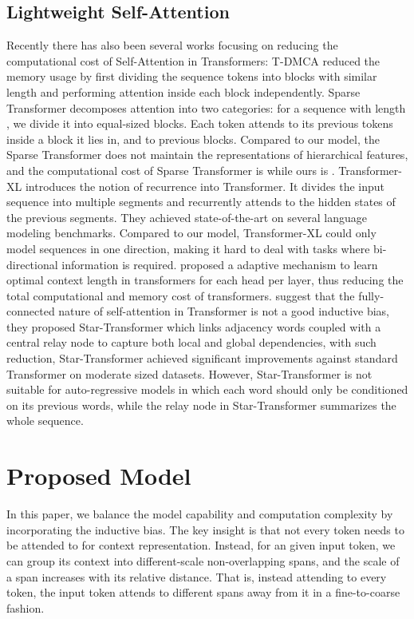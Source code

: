 \documentclass[11pt,a4paper]{article}
\begin{document}
\subsection{Lightweight Self-Attention }
Recently there has also been several works focusing on reducing the computational cost of Self-Attention in Transformers: T-DMCA \citep{LiuSPGSKS18} reduced the memory usage by first dividing the sequence tokens into blocks with similar length and performing attention inside each block independently. Sparse Transformer \citep{child2019sparsetransformer} decomposes attention into two categories: for a sequence with length , we divide it into  equal-sized blocks. Each token attends to its previous tokens inside a  block it lies in, and to  previous blocks. Compared to our model, the Sparse Transformer does not maintain the representations of hierarchical features, and the computational cost of Sparse Transformer is  while ours is .
 Transformer-XL \citep{dai2019transformer} introduces the notion of recurrence into Transformer. It divides the input sequence into multiple segments and recurrently attends to the hidden states of the previous segments. They achieved state-of-the-art on several language modeling benchmarks. Compared to our model, Transformer-XL could only model sequences in one direction, making it hard to deal with tasks where bi-directional information is required. \citet{sukhbaatar2019adaptive} proposed a adaptive mechanism to learn optimal context length in transformers for each head per layer, thus reducing the total computational and memory cost of transformers. \citet{guo2019startransformer} suggest that the fully-connected nature of self-attention in Transformer is not a good inductive bias, they proposed Star-Transformer which links adjacency words coupled with a central relay node to capture both local and global dependencies, with such reduction, Star-Transformer achieved significant improvements against standard Transformer on moderate sized datasets. However, Star-Transformer is not suitable for auto-regressive models in which each word should only be conditioned on its previous words, while the relay node in Star-Transformer summarizes the whole sequence.



\section{Proposed Model}

In this paper, we balance the model capability and computation complexity by incorporating the inductive bias. The key insight is that not every token needs to be attended to for context representation. Instead, for an given input token, we can group its context into different-scale non-overlapping spans, and the scale of a span increases with its relative distance. That is, instead attending to every token, the input token attends to different spans away from it in a fine-to-coarse fashion.
\end{document}
